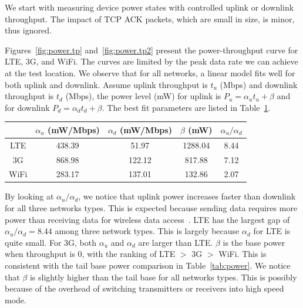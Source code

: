 We start with measuring device power states with controlled uplink or downlink throughput. The impact of TCP {\sf ACK} packets, which are small in size, is minor, thus ignored.


Figures~\ref{fig:power.tp} and~\ref{fig:power.tp2} present the power-throughput curve for LTE, 3G, and WiFi. The curves are limited by the peak data rate we can achieve at the test location.
We observe that for all networks, a linear model fits well for both uplink and downlink. Assume uplink throughput is $t_u$ (Mbps) and downlink throughput is $t_d$ (Mbps), the power level (mW) for uplink is $P_u = \alpha_u t_u + \beta$ and for downlink $P_d = \alpha_d t_d + \beta$.
The best fit parameters are listed in Table~\ref{tab:up.down}.

\begin{table}[t]
\begin{center}
\begin{tabular}{|c|c|c|c|c|}\hline
 & $\alpha_u$ (mW/Mbps) & $\alpha_d$ (mW/Mbps) & $\beta$ (mW) & $\alpha_u/\alpha_d$ \\\hline
LTE & 438.39 & 51.97 & 1288.04 & 8.44\\\hline
3G & 868.98 & 122.12 & 817.88 & 7.12\\\hline
WiFi & 283.17 & 137.01 & 132.86 & 2.07\\\hline
\end{tabular}
\label{tab:up.down}
\end{center}
\end{table}

By looking at $\alpha_u/\alpha_d$, we notice that uplink power increases faster than downlink for all three networks types. This is expected because sending data requires more power than receiving data for wireless data access~\cite{ieee.mimo}. LTE has the largest gap of $\alpha_u/\alpha_d = 8.44$ among three network types. This is largely because $\alpha_d$ for LTE is quite small. For 3G, both $\alpha_u$ and $\alpha_d$ are larger than LTE. $\beta$ is the base power when throughput is 0, with the ranking of LTE $>$ 3G $>$ WiFi. This is consistent with the tail base power comparison in Table~\ref{tab:power}. We notice that $\beta$ is slightly higher than the tail base for all networks types. This is possibly because of the overhead of switching transmitters or receivers into high speed mode.



